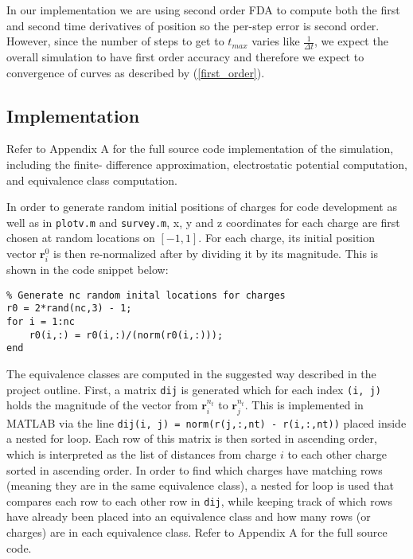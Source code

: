 \documentclass[10pt]{article}
\def\code#1{\texttt{#1}}
\begin{document}
In our implementation we are using second order FDA to compute both the first and second time 
derivatives of position so the per-step error is second order. However, since the number of steps to
get to $t_{max}$ varies like $\frac{1}{\Delta t}$, we expect the overall simulation to have first order
accuracy and therefore we expect to convergence of curves as described by (\ref{first_order}).

\subsection*{Implementation}

Refer to Appendix A for the full source code implementation of the simulation, including the finite-
difference approximation, electrostatic potential computation, and equivalence class computation.  

In order to generate random initial positions of charges for code development as well as in 
\code{plotv.m} and \code{survey.m}, x, y and z coordinates for each charge are first chosen at random
locations on $[-1,1]$. For each charge, its initial position vector $\mathbf{r}_i^0$ is then 
re-normalized after by dividing it by its magnitude. This is shown in the code snippet below:
\begin{verbatim}
% Generate nc random inital locations for charges
r0 = 2*rand(nc,3) - 1;
for i = 1:nc
    r0(i,:) = r0(i,:)/(norm(r0(i,:)));
end
\end{verbatim}

The equivalence classes are computed in the suggested way described in the project outline. First, a 
matrix \code{dij} is generated which for each index \code{(i, j)} holds the magnitude of the vector from 
$\mathbf{r}_i^{n_t}$ to $\mathbf{r}_j^{n_t}$. This is implemented in MATLAB via the line 
\code{dij(i, j) = norm(r(j,:,nt) - r(i,:,nt))} placed inside a nested for loop. Each row of this matrix is 
then sorted in ascending order, which is interpreted as the list of distances from charge $i$ to each other
charge sorted in ascending order. In order to find which charges have matching rows (meaning they are in 
the same equivalence class), a nested for loop is used that compares each row to each other row in 
\code{dij}, while keeping track of which rows have already been placed into an equivalence class and how 
many rows (or charges) are in each equivalence class. Refer to Appendix A for the full source code. 
\end{document}

